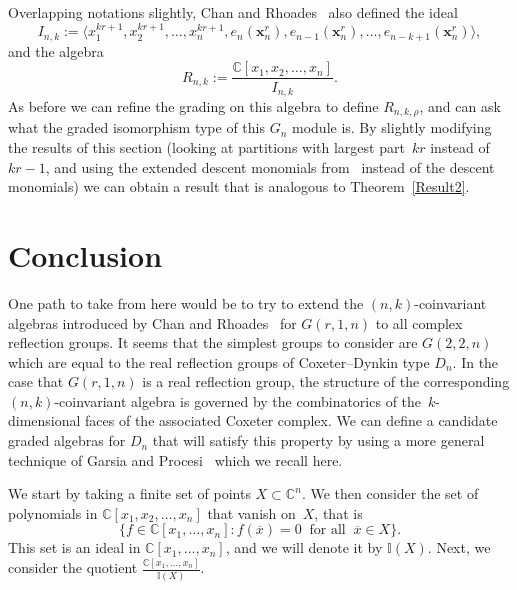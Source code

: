 \documentclass[10pt]{article}
\newcommand{\coloneqq}{:=}
\begin{document}
Overlapping notations slightly, Chan and Rhoades~\cite{CR} also defined the ideal
\begin{equation}
I_{n,k}\coloneqq \langle x_1^{kr+1},x_2^{kr+1},\ldots, x_n^{kr+1}, e_n(\mathbf{x}_n^r),e_{n-1}(\mathbf{x}_n^r),\ldots, 
e_{n-k+1}(\mathbf{x}_n^r)\rangle,
\end{equation}
and the algebra
\begin{equation}
R_{n,k}\coloneqq \frac{\mathbb{C}[x_1,x_2,\ldots, x_n]}{I_{n,k}}.
\end{equation} 
As before we can refine the grading on this algebra to define $R_{n,k,\rho}$, and can ask what the graded isomorphism type of 
this $G_n$ module is. By slightly modifying the results of this section (looking at partitions with largest part~$kr$ instead 
of $kr-1$, and using the extended descent monomials from~\cite{CR} instead of the descent monomials) we can obtain a result 
that is analogous to Theorem~\ref{Result2}.


\section{Conclusion}\label{Conclusion}

One path to take from here would be to try to extend the $(n,k)$-coinvariant algebras introduced by Chan and Rhoades~\cite{CR} 
for $G(r,1,n)$ to all complex reflection groups. It seems that the simplest groups to consider are $G(2,2,n)$ which are equal 
to the real reflection groups of Coxeter--Dynkin type $D_n$. In the case that $G(r,1,n)$ is a real reflection group, the 
structure of the corresponding $(n,k)$-coinvariant algebra is governed by the combinatorics of the~$k$-dimensional faces of 
the associated Coxeter complex. We can define a candidate graded algebras for $D_n$ that will satisfy this property by using a 
more general technique of Garsia and Procesi~\cite{GP} which we recall here.

We start by taking a finite set of points $X\subset \mathbb{C}^n$. We then consider the set of polynomials in 
$\mathbb{C}[x_1,x_2,\ldots, x_n]$ that vanish on~$X$, that is
\begin{equation}
\{f\in \mathbb{C}[x_1,\ldots, x_n]: 
f(\overline{x})=0 \ \text{ for all } \ \overline{x}\in X\}.
\end{equation}
 This set is an ideal in $\mathbb{C}[x_1,\ldots, 
x_n]$, and we will denote it by $\mathbb{I}(X)$. Next, we consider the quotient $\frac{\mathbb{C}[x_1,\ldots, 
x_n]}{\mathbb{I}(X)}$. 
\end{document}
